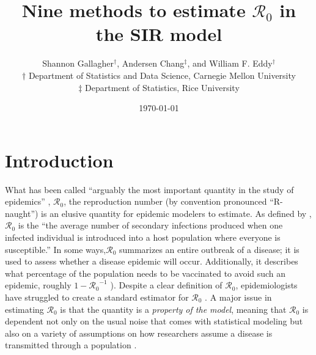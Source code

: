 \documentclass[12pt]{article}
\newcommand{\Wxxsir}{Nine } %
\newcommand{\rr}{\ensuremath{\mathcal{R}_0}}
\begin{document}




\title{\Wxxsir methods to estimate $\rr$ in the SIR model}
\author{ Shannon Gallagher$^{\dag}$, Andersen Chang$^{\ddag}$, and William F. Eddy$^{\dag}$ \\$\dag$ Department of Statistics and Data Science, Carnegie Mellon University\\ $\ddag$ Department of Statistics, Rice University}
\date{\today}
\maketitle

\tableofcontents


\section{Introduction}\label{sec:intro}
What has been called ``arguably the most important quantity in the study of epidemics'' \citep{Heesterbeek2002},  $\mathcal{R}_0$, the reproduction number (by convention pronounced ``R-naught'') is an elusive quantity for epidemic modelers to estimate.  As defined by \citet{anderson1992}, $\rr$ is the ``the average number of secondary infections produced when one infected individual is introduced into a host population where everyone is susceptible.''  In some ways,$\rr$ summarizes an entire outbreak of a disease; it  is used to assess whether a disease epidemic will occur.  Additionally, it describes what percentage of the population needs to be vaccinated to avoid such an epidemic, roughly $1-\rr^{-1}$ \citep{anderson1992}).  Despite a clear definition of $\rr$, epidemiologists have struggled to create a standard  estimator for $\rr$  \citep{hethcote2000}.  A major issue in estimating $\rr$ is that the quantity is a \textit{property of the model}, meaning that $\rr$ is dependent not only on the usual noise that comes with statistical modeling but also on a variety of assumptions on how researchers assume a disease is transmitted through a population \citep{diekmann2009}.
\end{document}
